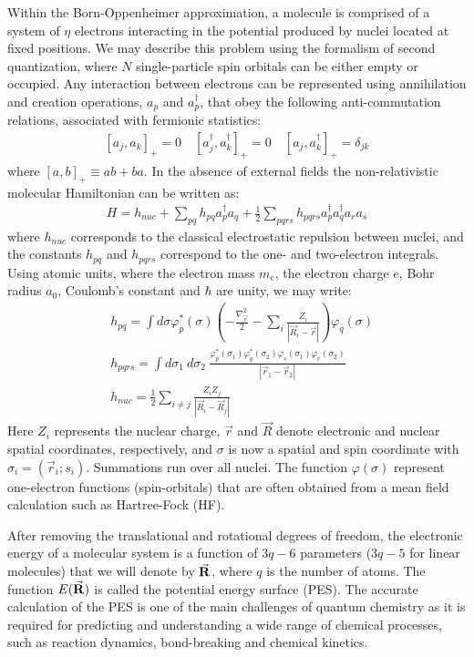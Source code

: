 \documentclass[superscriptaddress,aps,pra,twocolumn,nofootinbib,babel]{revtex4-1}
\begin{document}
Within the Born-Oppenheimer approximation, a molecule is comprised of a system of $\eta$ electrons interacting in the potential produced by nuclei located at fixed positions. We may describe this problem using the formalism of second quantization, where $N$ single-particle spin orbitals can be either empty or occupied. 
Any interaction between electrons can be represented using annihilation and creation operations, $a_p$ and $a^{\dagger}_p$, that obey the following anti-commutation relations, associated with fermionic statistics:
\begin{align}\label{eq:anticommutation}
[a_j,a_k]_{+}=0 \quad [a_j^{\dagger},a_k^{\dagger}]_{+}=0 \quad [a_j,a_k^{\dagger}]_{+}=\delta_{jk}
\end{align}
where $[a,b]_{+} \equiv ab+ba$. In the absence of external fields the non-relativistic molecular Hamiltonian can be written as:
\begin{align}\label{eq:molHamiltonian}
H=h_{nuc}+\sum_{pq}h_{pq} a^{\dagger}_p a_q + \frac{1}{2} \sum_{pqrs} h_{pqrs} a^{\dagger}_p a^{\dagger}_q a_r a_s
\end{align}
where $h_{nuc}$ corresponds to the classical electrostatic repulsion between nuclei, and the constants $h_{pq}$ and $h_{pqrs}$ correspond to the one- and two-electron integrals. Using atomic units, where the electron mass $m_e$, the electron charge $e$, Bohr radius $a_0$, Coulomb's constant and $\hbar$ are unity, we may write:
\begin{align}
&h_{pq} = \int d\sigma \varphi_p^*(\sigma) \left(-\frac{\nabla_{\vec{r}}^2}{2} - \sum_{i} \frac{Z_i}{|\vec{R}_i - \vec{r}|} \right)\varphi_q(\sigma) \label{eq:single_int}\\
 &h_{pqrs} = \int d\sigma_1\ d\sigma_2\ \frac{ \varphi_p^*(\sigma_1) \varphi_q^*(\sigma_2)  \varphi_s(\sigma_1) \varphi_r(\sigma_2) }{|\vec{r}_1 - \vec{r}_2|} \label{eq:double_int}\\
&h_{nuc}=\frac{1}{2}\sum_{i \neq j} \frac{Z_i Z_j}{|\vec{R}_i-\vec{R}_j|}
\end{align}
Here $Z_i$ represents the nuclear charge, $\vec{r}$ and $\vec{R}$ denote electronic and nuclear spatial coordinates, respectively, and $\sigma$ is now a spatial and spin coordinate with $\sigma_i=(\vec{r}_i;s_i)$. Summations run over all nuclei. The function $\varphi(\sigma)$ represent one-electron functions (spin-orbitals) that are often obtained from a mean field calculation such as Hartree-Fock (HF).

After removing the translational and rotational degrees of freedom, the electronic energy of a molecular system is a function of $3q-6$ parameters ($3q-5$ for linear molecules) that we will denote by $\vec{\bf R}$, where $q$ is the number of atoms. The function $E(\vec{\bf R})$ is called the potential energy surface (PES). The accurate calculation of the PES is one of the main challenges of quantum chemistry as it is required for predicting and understanding a wide range of chemical processes, such as reaction dynamics, bond-breaking and chemical kinetics. 
\end{document}
